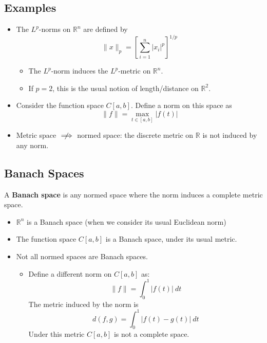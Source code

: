 \documentclass{article}
\newcommand{\R}{\mathbb{R}}
\theoremstyle{plain}
\theoremstyle{definition}
\begin{document}
		\subsection{Examples}
		\begin{itemize}
				\item The $L^p$-norms on $\R^n$ are defined by 
						\begin{equation*}
								\|x\|_p = \left[ \sum_{i=1}^{n} |x_i|^p \right]^{1/p}
						\end{equation*}
						\begin{itemize}
								\item The $L^p$-norm induces the $L^p$-metric on $\R^n$.
								\item If $p = 2$, this is the usual notion of length/distance on $\R^2$.
						\end{itemize}

				\item Consider the function space $C[a,b]$. Define a norm on this space as 
						\begin{equation*}
								\|f\| = \max_{t\in [a,b]} |f(t)|
						\end{equation*}

				\item Metric space $\centernot\implies$ normed space: the discrete metric on $\R$ is not induced by any norm. 
		\end{itemize}

		\subsection{Banach Spaces}
		A \textbf{Banach space} is any normed space where the norm induces a complete metric space. 
		\begin{itemize}
				\item $\R^n$ is a Banach space (when we consider its usual Euclidean norm) 
				\item The function space $C[a,b]$ is a Banach space, under its usual metric. 
				\item Not all normed spaces are Banach spaces. 
						\begin{itemize}
								\item Define a different norm on $C[a,b]$ as: 
										\begin{equation*}
												\|f\| = \int_0^1 |f(t)|\ dt 
										\end{equation*}
										The metric induced by the norm is 
										\begin{equation*}
												d(f,g) = \int_0^1 |f(t) - g(t)| \ dt
										\end{equation*}
										Under this metric $C[a,b]$ is not a complete space.
						\end{itemize}
		\end{itemize}
\end{document}

